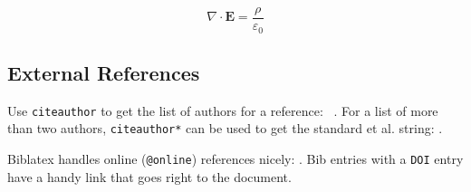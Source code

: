 \begin{equation}
  \nabla \cdot \bm{E} = \frac{\rho}{\varepsilon_0}
  \label{eq:gauss}
\end{equation}

\subsection{External References}

Use \texttt{citeauthor} to get the list of authors for a reference:
\citeauthor{TIT:DiffieH76}~\cite{TIT:DiffieH76}.
For a list of more than two authors, \texttt{citeauthor*} can be used to get the
standard et al. string:
\citeauthor*{JMLR:PedregosaVGMTGBPWDVPCBPD11}.

Biblatex handles online (\texttt{@online}) references nicely:
\cite{bhattacharyya}. Bib entries with a \texttt{DOI} entry have a handy link
that goes right to the document.
